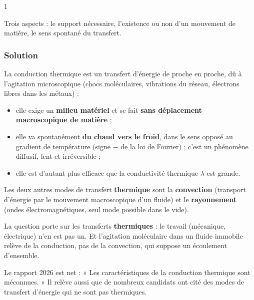 \documentclass[11pt,a4paper]{article}
\providecommand{\tightlist}{\setlength{\itemsep}{0pt}\setlength{\parskip}{0pt}}
\begin{document}
\begin{indication}{1}

Trois aspects : le support nécessaire, l'existence ou non d'un mouvement de matière, le sens spontané du transfert.

\end{indication}

\hypertarget{solution-2}{%
\subsubsection{Solution}\label{solution-2}}

La conduction thermique est un transfert d'énergie de proche en proche, dû à l'agitation microscopique (chocs moléculaires, vibrations du réseau, électrons libres dans les métaux) :

\begin{itemize}
\tightlist
\item
  elle exige un \textbf{milieu matériel} et se fait \textbf{sans déplacement macroscopique de matière} ;
\item
  elle va spontanément \textbf{du chaud vers le froid}, dans le sens opposé au gradient de température (signe \(-\) de la loi de Fourier) ; c'est un phénomène diffusif, lent et irréversible ;
\item
  elle est d'autant plus efficace que la conductivité thermique \(\lambda\) est grande.
\end{itemize}

Les deux autres modes de transfert \textbf{thermique} sont la \textbf{convection} (transport d'énergie par le mouvement macroscopique d'un fluide) et le \textbf{rayonnement} (ondes électromagnétiques, seul mode possible dans le vide).

\begin{piege}

La question porte sur les transferts \textbf{thermiques} : le travail (mécanique, électrique) n'en est pas un. Et l'agitation moléculaire dans un fluide immobile relève de la conduction, pas de la convection, qui suppose un écoulement d'ensemble.

\end{piege}

\begin{jury}

Le rapport 2026 est net : « Les caractéristiques de la conduction thermique sont méconnues. » Il relève aussi que de nombreux candidats ont cité des modes de transfert d'énergie qui ne sont pas thermiques.

\end{jury}
\end{document}
